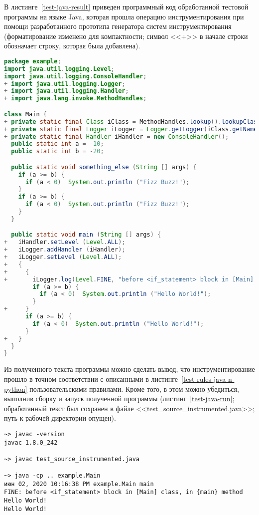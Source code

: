 В листинге~\ref{test-java-result} приведен программный код обработанной тестовой программы на языке Java, которая прошла операцию инструментирования при помощи разработанного прототипа генератора систем инструментирования (форматирование изменено для компактности; символ <<+>> в начале строки обозначает строку, которая была добавлена).

\begin{lstlisting}[frame=single, language=Java, label={test-java-result}, caption={Текст инструментированного тестового приложения.}]
package example;
import java.util.logging.Level;
import java.util.logging.ConsoleHandler;
+ import java.util.logging.Logger;
+ import java.util.logging.Handler;
+ import java.lang.invoke.MethodHandles;

class Main {
+ private static final Class iClass = MethodHandles.lookup().lookupClass();
+ private static final Logger iLogger = Logger.getLogger(iClass.getName());
+ private static final Handler iHandler = new ConsoleHandler();
  public static int a = -10;
  public static int b = -20;

  public static void something_else (String [] args) {
    if (a >= b) {
      if (a < 0)  System.out.println ("Fizz Buzz!");
    }
    if (a >= b) {
      if (a < 0)  System.out.println ("Fizz Buzz!");
    }
  }

  public static void main (String [] args) {
+   iHandler.setLevel (Level.ALL);
+   iLogger.addHandler (iHandler);
+   iLogger.setLevel (Level.ALL);
+   {
+     {
+       iLogger.log(Level.FINE, "before <if_statement> block in [Main] class, in {main} method");
        if (a >= b) {
          if (a < 0)  System.out.println ("Hello World!");
        }
+     }
      if (a >= b) {
        if (a < 0)  System.out.println ("Hello World!");
      }
+   }
  }
}
\end{lstlisting}

Из полученного текста программы можно сделать вывод, что инструментирование прошло в точном соответствии с описанными в листинге~\ref{test-rules-java-n-python} пользовательскими правилами.
Кроме того, в этом можно убедиться, выполнив сборку и запуск полученной программы (листинг~\ref{test-java-run}; обработанный текст был сохранен в файле <<test\_source\_instrumented.java>>; путь к рабочей директории опущен).

\begin{lstlisting}[frame=single, label={test-java-run}, caption={Результаты сборки и запуска обработанного тестового приложения.}]
~> javac -version
javac 1.8.0_242

~> javac test_source_instrumented.java

~> java -cp .. example.Main
июн 02, 2020 10:16:38 PM example.Main main
FINE: before <if_statement> block in [Main] class, in {main} method
Hello World!
Hello World!
\end{lstlisting}

